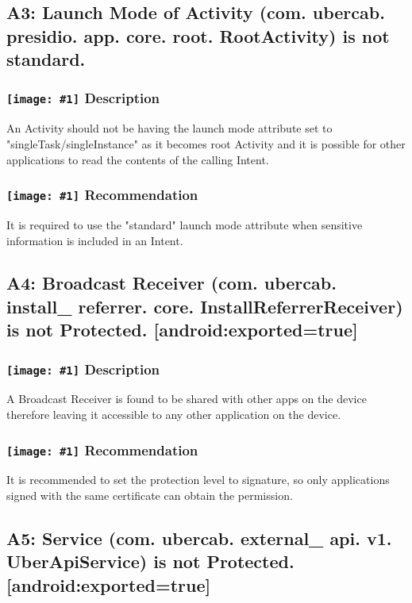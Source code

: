 \documentclass[12p]{article}
\newcommand{\icon}[1]{\texttt{[image: \#1]}}
\begin{document}
\subsection{A3: Launch Mode of Activity (com. ubercab. presidio. app. core. root. RootActivity) is not standard.}
\subsubsection*{\protect\icon{/home/miki/Documents/GITHUB/AndroidPermissions/python/vulns/report_icons/basic_sheet.png} Description}
An Activity should not be having the launch mode attribute set to "singleTask/singleInstance" as it becomes root Activity and it is possible for other applications to read the contents of the calling Intent.
\subsubsection*{\protect\icon{/home/miki/Documents/GITHUB/AndroidPermissions/python/vulns/report_icons/basic_todo.png} Recommendation}
It is required to use the "standard" launch mode attribute when sensitive information is included in an Intent.
\subsection{A4: Broadcast Receiver (com. ubercab. install\_ referrer. core. InstallReferrerReceiver) is not Protected. [android:exported=true]}
\subsubsection*{\protect\icon{/home/miki/Documents/GITHUB/AndroidPermissions/python/vulns/report_icons/basic_sheet.png} Description}
A Broadcast Receiver is found to be shared with other apps on the device therefore leaving it accessible to any other application on the device.
\subsubsection*{\protect\icon{/home/miki/Documents/GITHUB/AndroidPermissions/python/vulns/report_icons/basic_todo.png} Recommendation}
It is recommended to set the protection level to signature, so only applications signed with the same certificate can obtain the permission.
\subsection{A5: Service (com. ubercab. external\_ api. v1. UberApiService) is not Protected. [android:exported=true]}
\end{document}
